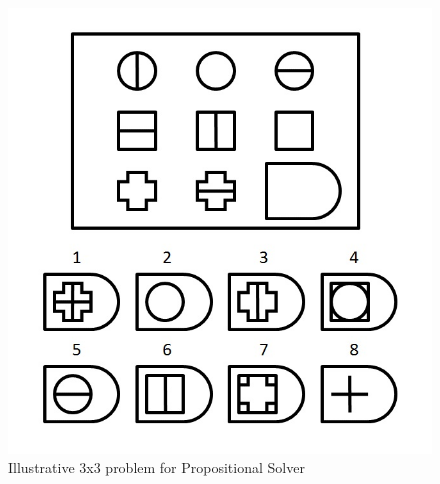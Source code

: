 \documentclass[10pt, letter]{article}
\begin{document}
\begin{figure}[h!]
  \centering
    \includegraphics[scale = 0.25]{Images/Fig11}
    \caption{Illustrative 3x3 problem for Propositional Solver}
  \label{fig12}
\end{figure}
\end{document}
